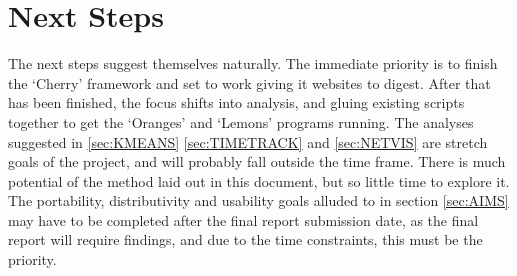 \documentclass[11pt, oneside]{article}   	%
\begin{document}
\section{Next Steps}
The next steps suggest themselves naturally. The immediate priority is to finish the `Cherry' framework and set to work giving it websites to digest. After that has been finished, the focus shifts into analysis, and gluing existing scripts together to get the `Oranges' and `Lemons' programs running. 
The analyses suggested in \ref{sec:KMEANS} \ref{sec:TIMETRACK} and \ref{sec:NETVIS} are stretch goals of the project, and will probably fall outside the time frame. There is much potential of the method laid out in this document, but so little time to explore it. 
The portability, distributivity and usability goals alluded to in section \ref{sec:AIMS} may have to be completed after the final report submission date, as the final report will require findings, and due to the time constraints, this must be the priority. 
\label{sec:NEXTSTEPS}
\end{document}
